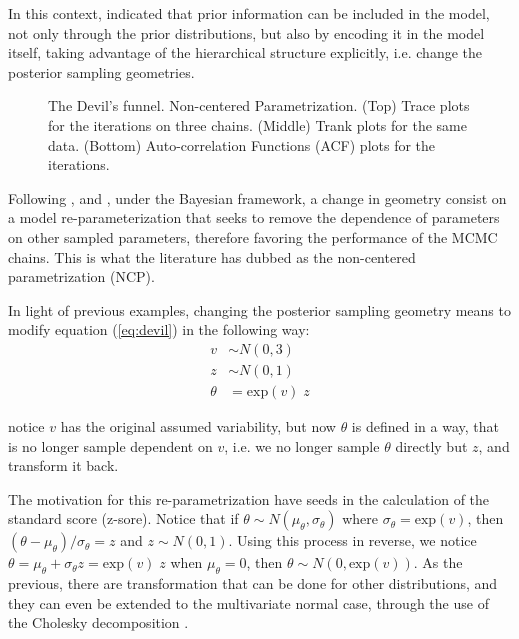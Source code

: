 In this context, \citet{Betancourt_et_al_2013} indicated that prior information can be included in the model, not only through the prior distributions, but also by encoding it in the model itself, taking advantage of the hierarchical structure explicitly, i.e. change the posterior sampling geometries. 
%
\begin{figure}[h]
	\centering
	\begin{subfigure}
		\texttt{[image: 3\_trace\_NC]}
	\end{subfigure}
	\begin{subfigure}
		\texttt{[image: 3\_trank\_NC]}
	\end{subfigure}
	\begin{subfigure}
		\texttt{[image: 3\_acf\_NC]}
	\end{subfigure}
	\caption[The Devil's funnel. Non-centered Parametrization.]%
	{The Devil's funnel. Non-centered Parametrization. (Top) Trace plots for the iterations on three chains. (Middle) Trank plots for the same data. (Bottom) Auto-correlation Functions (ACF) plots for the iterations.}
	\label{fig:devil_NC}
\end{figure}

Following \citet{Papaspiliopoulos_et_al_2003, Papaspiliopoulos_et_al_2007}, and \citet{Betancourt_et_al_2013}, under the Bayesian framework, a change in geometry consist on a model re-parameterization that seeks to remove the dependence of parameters on other sampled parameters, therefore favoring the performance of the MCMC chains. This is what the literature has dubbed as the non-centered parametrization (NCP).

In light of previous examples, changing the posterior sampling geometry means to modify equation (\ref{eq:devil}) in the following way:
%
\begin{equation} \label{eq:devil_NC}
	\begin{split}	
		v &\sim N(0, 3) \\
		z &\sim N(0, 1) \\
		\theta &= \text{exp}(v) \; z
	\end{split}
\end{equation}

\noindent notice $v$ has the original assumed variability, but now $\theta$ is defined in a way, that is no longer sample dependent on $v$, i.e. we no longer sample $\theta$ directly but $z$, and transform it back.

The motivation for this re-parametrization have seeds in the calculation of the standard score (z-sore). Notice that if $\theta \sim N(\mu_{\theta}, \sigma_{\theta})$ where $\sigma_{\theta} = \text{exp}(v)$, then $(\theta - \mu_{\theta})/\sigma_{\theta} = z$ and $z \sim N(0,1)$. Using this process in reverse, we notice $\theta = \mu_{\theta} + \sigma_{\theta} z = \text{exp}(v) \; z$ when $\mu_{\theta}=0$, then $\theta \sim N(0, \text{exp}(v))$. As the previous, there are transformation that can be done for other distributions, and they can even be extended to the multivariate normal case, through the use of the Cholesky decomposition \cite{McElreath_2020}.

